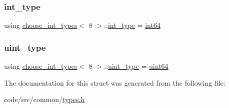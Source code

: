 \subsubsection{\texorpdfstring{int\+\_\+type}{int\_type}}
{\footnotesize\ttfamily using \hyperlink{structchoose__int__types}{choose\+\_\+int\+\_\+types}$<$ 8 $>$\+::\hyperlink{structchoose__int__types_3_018_01_4_a4dde5a87f22a82a381bbae5f6d205d05}{int\+\_\+type} =  \hyperlink{types_8h_a552928ab323811c9694f5b7c9f53d0fb}{int64}}

\mbox{\label{structchoose__int__types_3_018_01_4_a4e70f94b235eba865f95080e668f666a}} 
\subsubsection{\texorpdfstring{uint\+\_\+type}{uint\_type}}
{\footnotesize\ttfamily using \hyperlink{structchoose__int__types}{choose\+\_\+int\+\_\+types}$<$ 8 $>$\+::\hyperlink{structchoose__int__types_3_018_01_4_a4e70f94b235eba865f95080e668f666a}{uint\+\_\+type} =  \hyperlink{types_8h_a60e8696a4678cd348e991a1f172e53f7}{uint64}}



The documentation for this struct was generated from the following file\+:\begin{DoxyCompactItemize}
\item 
code/src/common/\hyperlink{types_8h}{types.\+h}\end{DoxyCompactItemize}
